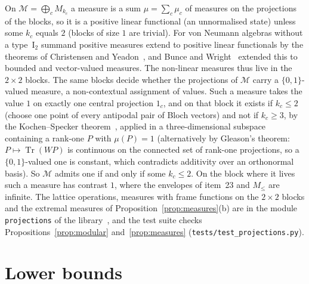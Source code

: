 \documentclass[11pt]{article}
\DeclareMathOperator{\Tr}{Tr}
\newcommand{\M}{\mathcal{M}}
\theoremstyle{plain}
\theoremstyle{definition}
\theoremstyle{remark}
\begin{document}
On $\M=\bigoplus_cM_{k_c}$ a measure is a sum $\mu=\sum_c\mu_c$ of measures on the projections of the blocks, so it is a
positive linear functional (an unnormalised state) unless some $k_c$ equals $2$ (blocks of size $1$ are trivial). For
von Neumann algebras without a type~I$_2$ summand positive measures extend to positive linear functionals by the
theorems of Christensen and Yeadon~\cite{christensen1982,yeadon1983,yeadon1984}, and Bunce and Wright~\cite{bunce1992}
extended this to bounded and vector-valued measures. The non-linear measures thus live in the $2\times2$ blocks. The same blocks decide whether the
projections of $\M$ carry a $\{0,1\}$-valued measure, a non-contextual assignment of values. Such a measure takes the
value $1$ on exactly one central projection $1_c$, and on that block it exists if $k_c\le2$ (choose one point of every
antipodal pair of Bloch vectors) and not if $k_c\ge3$, by the Kochen--Specker theorem~\cite{kochen1967}, applied in a
three-dimensional subspace containing a rank-one $P$ with $\mu(P)=1$ (alternatively by Gleason's theorem: $P\mapsto\Tr(WP)$
is continuous on the connected set of rank-one projections, so a $\{0,1\}$-valued one is constant, which contradicts
additivity over an orthonormal basis). So $\M$ admits one if and only if some $k_c\le2$. On the block where it lives such
a measure has contrast $1$, where the envelopes of item~23 and $M_\le$ are infinite.
The lattice operations, measures with frame functions on the $2\times2$ blocks and the extremal measures of
Proposition~\ref{prop:measures}(b) are in the module \texttt{projections} of the library~\cite{lib}, and the test suite
checks Propositions~\ref{prop:modular} and~\ref{prop:measures} (\texttt{tests/test\_projections.py}).

\section{Lower bounds}\label{sec:lower}
\end{document}
